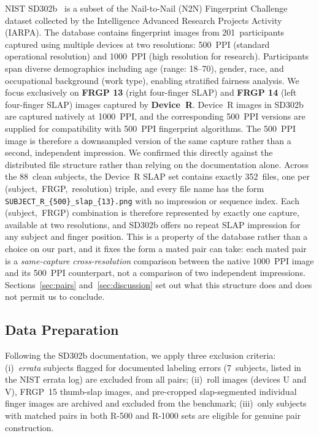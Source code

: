 \documentclass[journal]{IEEEtran}
\begin{document}
NIST SD302b~\cite{nist_sd302} is a subset of the Nail-to-Nail (N2N)
Fingerprint Challenge dataset collected by the Intelligence Advanced
Research Projects Activity (IARPA).
The database contains fingerprint images from 201~participants captured
using multiple devices at two resolutions: 500~PPI (standard operational
resolution) and 1000~PPI (high resolution for research).
Participants span diverse demographics including age (range: 18--70),
gender, race, and occupational background (work type), enabling
stratified fairness analysis.
We focus exclusively on \textbf{FRGP 13} (right four-finger SLAP) and
\textbf{FRGP 14} (left four-finger SLAP) images captured by
\textbf{Device~R}.
Device~R images in SD302b are captured natively at 1000~PPI, and the
corresponding 500~PPI versions are supplied for compatibility with
500~PPI fingerprint algorithms. The 500~PPI image is therefore a
downsampled version of the same capture rather than a second, independent
impression.
We confirmed this directly against the distributed file structure rather
than relying on the documentation alone. Across the 88~clean subjects, the
Device~R SLAP set contains exactly 352~files, one per
(subject,~FRGP,~resolution) triple, and every file name has the form
\texttt{SUBJECT\_R\_\{500\}\_slap\_\{13\}.png} with
no impression or sequence index. Each (subject,~FRGP) combination is
therefore represented by exactly one capture, available at two resolutions,
and SD302b offers no repeat SLAP impression for any subject and finger
position.
This is a property of the database rather than a choice on our part, and it
fixes the form a mated pair can take: each mated pair is a
\emph{same-capture cross-resolution} comparison between the native
1000~PPI image and its 500~PPI counterpart, not a comparison of two
independent impressions.
Sections~\ref{sec:pairs} and~\ref{sec:discussion} set out what this
structure does and does not permit us to conclude.

\subsection{Data Preparation}

Following the SD302b documentation, we apply three exclusion criteria:
(i)~\emph{errata} subjects flagged for documented labeling errors
(7~subjects, listed in the NIST errata log) are excluded from all pairs;
(ii)~roll images (devices U and V), FRGP~15 thumb-slap images, and
pre-cropped slap-segmented individual finger images are archived and
excluded from the benchmark;
(iii)~only subjects with matched pairs in both R-500 and R-1000 sets
are eligible for genuine pair construction.
\end{document}

